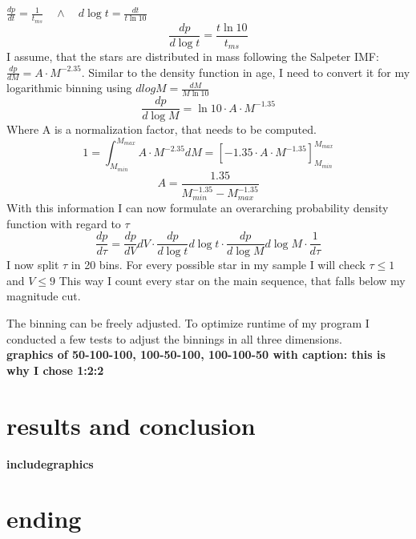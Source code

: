 \documentclass[a4paper,10pt]{article}
\begin{document}
  $\frac{dp}{dt}=\frac{1}{t_{ms}}\quad \land \quad d\log t=\frac{dt}{t \ln 10}$
 \begin{equation}
  \frac{dp}{d\log t}=\frac{t\ln 10}{t_{ms}}
 \end{equation}
 I assume, that the stars are distributed in mass following the Salpeter IMF:
 $\frac{dp}{dM}=A\cdot M^{-2.35}$\citep{1955ApJ...121..161S}. Similar
 to the density function in age, I need to convert it for my logarithmic binning using $dlogM = \frac{dM}{M\ln 10}$
 \begin{equation}
  \frac{dp}{d\log M}=\ln 10 \cdot A\cdot M^{-1.35}
 \end{equation}
 Where A is a normalization factor, that needs to be computed. 
 \begin{equation}
  1=\int_{M_{min}}^{M_{max}}A\cdot M^{-2.35} dM =\left[ -1.35\cdot A\cdot M^{-1.35}\right]_{M_{min}}^{M_{max}}
 \end{equation}
 \begin{equation}
  A= \frac{1.35}{M_{min}^{-1.35}-M_{max}^{-1.35}}
 \end{equation}
 With this information I can now formulate an overarching probability density function with regard to $\tau$
 \begin{equation}
  \frac{dp}{d\tau}=\frac{dp}{dV}dV \cdot \frac{dp}{d\log t}d\log t \cdot \frac{dp}{d\log M}d\log M\cdot \frac{1}{d\tau}
 \end{equation}
 I now split $\tau$ in 20 bins. For every possible star in my sample I will check $\tau\le 1$ and $V\le 9$ This way I count every
 star on the main sequence, that falls below my magnitude cut. 

 
 The binning can be freely adjusted. To optimize runtime of my program I conducted a few tests to adjust the binnings in all three dimensions.\\
 \textbf{graphics of 50-100-100, 100-50-100, 100-100-50 with caption: this is why I chose 1:2:2}\\
 \section{results and conclusion}
 \textbf{includegraphics}
 
 
 
 \section{ending}
 
 
\end{document}
